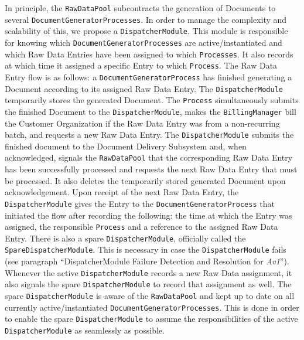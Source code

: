 \documentclass[a4paper,10pt]{article}
\begin{document}
In principle, the \texttt{RawDataPool} subcontracts the generation of Documents to several \texttt{DocumentGeneratorProcesses}. In order to manage the complexity and scalability of this, we propose a \texttt{DispatcherModule}. This module is responsible for knowing which \texttt{DocumentGeneratorProcesses} are active/instantiated and which Raw Data Entries have been assigned to which \texttt{Processes}. It also records at which time it assigned a specific Entry to which \texttt{Process}. The Raw Data Entry flow is as follows: a \texttt{DocumentGeneratorProcess} has finished generating a Document according to its assigned Raw Data Entry. The \texttt{DispatcherModule} temporarily stores the generated Document. The \texttt{Process} simultaneously submits the finished Document to the \texttt{DispatcherModule}, makes the \texttt{BillingManager} bill the Customer Organization if the Raw Data Entry was from a non-recurring batch, and requests a new Raw Data Entry. The \texttt{DispatcherModule} submits the finished document to the Document Delivery Subsystem and, when acknowledged, signals the \texttt{RawDataPool} that the corresponding Raw Data Entry has been successfully processed and requests the next Raw Data Entry that must be processed. It also deletes the temporarily stored generated Document upon acknowledgement. Upon receipt of the next Raw Data Entry, the \texttt{DispatcherModule} gives the Entry to the \texttt{DocumentGeneratorProcess} that initiated the flow after recording the following: the time at which the Entry was assigned, the responsible \texttt{Process} and a reference to the assigned Raw Data Entry. There is also a spare \texttt{DispatcherModule}, officially called the \texttt{SpareDispatcherModule}. This is necessary in case the \texttt{DispatcherModule} fails (see paragraph ``DispatcherModule Failure Detection and Resolution for \emph{Av1}''). Whenever the active \texttt{DispatcherModule} records a new Raw Data assignment, it also signals the spare \texttt{DispatcherModule} to record that assignment as well. The spare \texttt{DispatcherModule} is aware of the \texttt{RawDataPool} and kept up to date on all currently active/instantiated \texttt{DocumentGeneratorProcesses}. This is done in order to enable the spare \texttt{DispatcherModule} to assume the responsibilities of the active \texttt{DispatcherModule} as seamlessly as possible.
\end{document}
